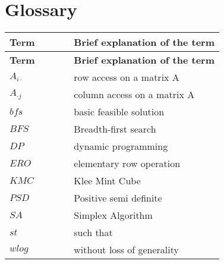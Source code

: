 \documentclass[main]{subfiles}
\begin{document}
\section{Glossary}
\renewcommand{\arraystretch}{1.5}


\begin{longtable}{p{0.3\linewidth} p{0.7\linewidth}}
\hline \textbf{Term} & \textbf{Brief explanation of the term}\\ \hline
\endfirsthead

\hline \textbf{Term} & \textbf{Brief explanation of the term}\\ \hline\hline
\endhead
$A_{i\cdot}$ & row access on a matrix A\\
$A_{\cdot j}$ & column access on a matrix A\\
$bfs$ & basic feasible solution\\
$BFS$ & Breadth-first search\\
$DP$ & dynamic programming\\
$ERO$ & elementary row operation\\
$KMC$ & Klee Mint Cube\\
$PSD$ & Positive semi definite\\
$SA$ & Simplex Algorithm\\
$st$ & such that\\
$wlog$ & without loss of generality\\

\end{longtable}
\end{document}

